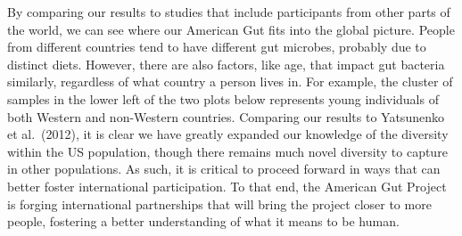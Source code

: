\documentclass[10pt,letterpaper]{article}
\begin{document}
By comparing our results to studies that include participants from other parts of the world, we can see where our American Gut fits into the global picture.  People from different countries tend to have different gut microbes, probably due to distinct diets.  However, there are also factors, like age, that impact gut bacteria similarly, regardless of what country a person lives in.  For example, the cluster of samples in the lower left of the two plots below represents young individuals of both Western and non-Western countries. Comparing our results to Yatsunenko et al.\ (2012), it is clear we have greatly expanded our knowledge of the diversity within the US population, though there remains much novel diversity to capture in other populations. As such, it is critical to proceed forward in ways that can better foster international participation. To that end, the American Gut Project is forging international partnerships that will bring the project closer to more people, fostering a better understanding of what it means to be human.
\end{document}
